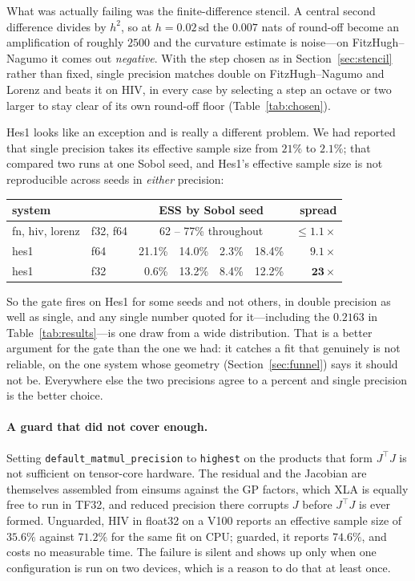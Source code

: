 \documentclass[11pt]{article}
\theoremstyle{plain}
\theoremstyle{definition}
\theoremstyle{remark}
\begin{document}
What was actually failing was the finite-difference stencil. A central second difference divides by
$h^2$, so at $h = 0.02\,\mathrm{sd}$ the $0.007$ nats of round-off become an amplification of
roughly $2500$ and the curvature estimate is noise---on FitzHugh--Nagumo it comes out
\emph{negative}. With the step chosen as in Section~\ref{sec:stencil} rather than fixed, single
precision matches double on FitzHugh--Nagumo and Lorenz and beats it on HIV, in every case by
selecting a step an octave or two larger to stay clear of its own round-off floor
(Table~\ref{tab:chosen}).

Hes1 looks like an exception and is really a different problem. We had reported that single
precision takes its effective sample size from $21\%$ to $2.1\%$; that compared two runs at one
Sobol seed, and Hes1's effective sample size is not reproducible across seeds in \emph{either}
precision:

\begin{center}\small
\begin{tabular}{llrrrrr}
\toprule
system & & \multicolumn{4}{c}{ESS by Sobol seed} & spread\\
\midrule
fn, hiv, lorenz & f32, f64 & \multicolumn{4}{c}{62 -- 77\% throughout} & $\le 1.1\times$\\
hes1 & f64 & 21.1\% & 14.0\% & 2.3\% & 18.4\% & $\mathbf{9.1\times}$\\
hes1 & f32 & 0.6\% & 13.2\% & 8.4\% & 12.2\% & $\mathbf{23\times}$\\
\bottomrule
\end{tabular}
\end{center}

So the gate fires on Hes1 for some seeds and not others, in double precision as well as single,
and any single number quoted for it---including the $0.2163$ in Table~\ref{tab:results}---is one
draw from a wide distribution. That is a better argument for the gate than the one we had: it
catches a fit that genuinely is not reliable, on the one system whose geometry
(Section~\ref{sec:funnel}) says it should not be. Everywhere else the two precisions agree to a
percent and single precision is the better choice.

\paragraph{A guard that did not cover enough.} Setting \texttt{default\_matmul\_precision} to
\texttt{highest} on the products that form $J^\top J$ is not sufficient on tensor-core hardware.
The residual and the Jacobian are themselves assembled from einsums against the GP factors, which
XLA is equally free to run in TF32, and reduced precision there corrupts $J$ before $J^\top J$ is
ever formed. Unguarded, HIV in float32 on a V100 reports an effective sample size of $35.6\%$
against $71.2\%$ for the same fit on CPU; guarded, it reports $74.6\%$, and costs no measurable
time. The failure is silent and shows up only when one configuration is run on two devices, which
is a reason to do that at least once.
\end{document}
